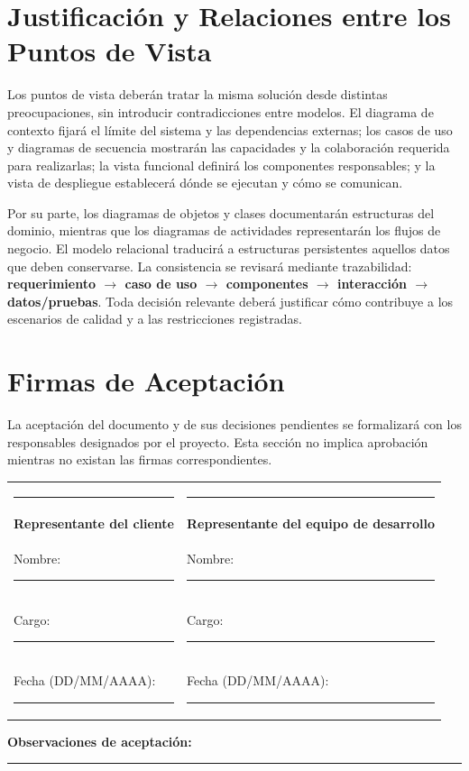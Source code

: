 \documentclass[11pt,a4paper,oneside]{article}
\begin{document}
\section{Justificación y Relaciones entre los Puntos de Vista}
Los puntos de vista deberán tratar la misma solución desde distintas preocupaciones, sin introducir contradicciones entre modelos. El diagrama de contexto fijará el límite del sistema y las dependencias externas; los casos de uso y diagramas de secuencia mostrarán las capacidades y la colaboración requerida para realizarlas; la vista funcional definirá los componentes responsables; y la vista de despliegue establecerá dónde se ejecutan y cómo se comunican.

Por su parte, los diagramas de objetos y clases documentarán estructuras del dominio, mientras que los diagramas de actividades representarán los flujos de negocio. El modelo relacional traducirá a estructuras persistentes aquellos datos que deben conservarse. La consistencia se revisará mediante trazabilidad: \textbf{requerimiento $\rightarrow$ caso de uso $\rightarrow$ componentes $\rightarrow$ interacción $\rightarrow$ datos/pruebas}. Toda decisión relevante deberá justificar cómo contribuye a los escenarios de calidad y a las restricciones registradas.

\clearpage
\section{Firmas de Aceptación}
La aceptación del documento y de sus decisiones pendientes se formalizará con los responsables designados por el proyecto. Esta sección no implica aprobación mientras no existan las firmas correspondientes.

\vspace{0.55cm}
\begin{tabularx}{\textwidth}{@{}X X@{}}
\rule{.90\linewidth}{.45pt} & \rule{.90\linewidth}{.45pt}\\
\textbf{Representante del cliente} & \textbf{Representante del equipo de desarrollo}\\
Nombre: \rule{.42\linewidth}{.3pt} & Nombre: \rule{.42\linewidth}{.3pt}\\[7pt]
Cargo: \rule{.45\linewidth}{.3pt} & Cargo: \rule{.45\linewidth}{.3pt}\\[7pt]
Fecha (DD/MM/AAAA): \rule{.20\linewidth}{.3pt} & Fecha (DD/MM/AAAA): \rule{.20\linewidth}{.3pt}\\
\end{tabularx}

\vspace{0.5cm}
\textbf{Observaciones de aceptación:}\\[0.3cm]
\rule{\textwidth}{.35pt}
\end{document}

